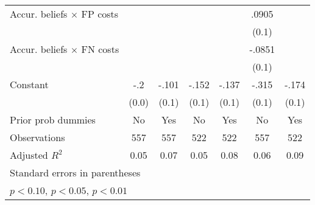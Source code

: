 \begin{table}[htbp]
\begin{tabular}{l*{6}{c}}
Accur. beliefs $\times$ FP costs&                  &                  &                  &                  &    .0905         &                  \\
                &                  &                  &                  &                  &    (0.1)         &                  \\
Accur. beliefs $\times$ FN costs&                  &                  &                  &                  &   -.0851         &                  \\
                &                  &                  &                  &                  &    (0.1)         &                  \\
Constant        &      -.2\sym{***}&    -.101         &    -.152\sym{***}&    -.137         &    -.315\sym{***}&    -.174\sym{*}  \\
                &    (0.0)         &    (0.1)         &    (0.1)         &    (0.1)         &    (0.1)         &    (0.1)         \\
Prior prob dummies &       No         &      Yes         &       No         &      Yes         &       No         &      Yes         \\
\hline
Observations    &      557         &      557         &      522         &      522         &      557         &      522         \\
Adjusted \(R^{2}\)&     0.05         &     0.07         &     0.05         &     0.08         &     0.06         &     0.09         \\
\hline\hline
\multicolumn{7}{l}{\footnotesize Standard errors in parentheses}\\
\multicolumn{7}{l}{\footnotesize \sym{*} \(p<0.10\), \sym{**} \(p<0.05\), \sym{***} \(p<0.01\)}\\
\end{tabular}
\end{table}
